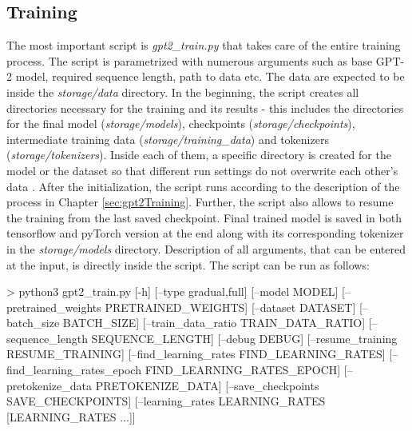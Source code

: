 \subsection*{Training}
The most important script is \textit{gpt2\_train.py} that takes care of the entire training process. The script is parametrized with numerous arguments such as base GPT-2 model, required sequence length, path to data etc. The data are expected to be inside the \textit{storage/data} directory. In the beginning, the script creates all directories necessary for the training and its results - this includes the directories for the final model (\textit{storage/models}), checkpoints (\textit{storage/checkpoints}), intermediate training data (\textit{storage/training\_data}) and tokenizers (\textit{storage/tokenizers}). Inside each of them, a specific directory is created for the model or the dataset so that different run settings do not overwrite each other's data . After the initialization, the script runs according to the description of the process in Chapter \ref{sec:gpt2Training}. Further, the script also allows to resume the training from the last saved checkpoint. Final trained model is saved in both tensorflow and pyTorch version at the end along with its corresponding tokenizer in the \textit{storage/models} directory. Description of all arguments, that can be entered at the input, is directly inside the script. The script can be run as follows:
\newpage
\begin{code}
> python3 gpt2_train.py [-h] [--type {gradual,full}] 
              [--model MODEL]
              [--pretrained_weights PRETRAINED_WEIGHTS] 
              [--dataset DATASET] 
              [--batch_size BATCH_SIZE]
              [--train_data_ratio TRAIN_DATA_RATIO] 
              [--sequence_length SEQUENCE_LENGTH] [--debug DEBUG] 
              [--resume_training RESUME_TRAINING] 
              [--find_learning_rates FIND_LEARNING_RATES]
              [--find_learning_rates_epoch FIND_LEARNING_RATES_EPOCH]
              [--pretokenize_data PRETOKENIZE_DATA] 
              [--save_checkpoints SAVE_CHECKPOINTS] 
              [--learning_rates LEARNING_RATES [LEARNING_RATES ...]]
\end{code}

